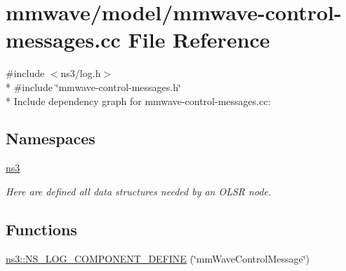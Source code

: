 \hypertarget{mmwave-control-messages_8cc}{}\section{mmwave/model/mmwave-\/control-\/messages.cc File Reference}
\label{mmwave-control-messages_8cc}
{\ttfamily \#include $<$ns3/log.\+h$>$}\\*
{\ttfamily \#include \char`\"{}mmwave-\/control-\/messages.\+h\char`\"{}}\\*
Include dependency graph for mmwave-\/control-\/messages.cc\+:
\subsection*{Namespaces}
\begin{DoxyCompactItemize}
\item 
 \hyperlink{namespacens3}{ns3}
\begin{DoxyCompactList}\small\item\em Here are defined all data structures needed by an O\+L\+SR node. \end{DoxyCompactList}\end{DoxyCompactItemize}
\subsection*{Functions}
\begin{DoxyCompactItemize}
\item 
\hyperlink{namespacens3_a3c3acc187f247fd3e4edb8e3a03a7e56}{ns3\+::\+N\+S\+\_\+\+L\+O\+G\+\_\+\+C\+O\+M\+P\+O\+N\+E\+N\+T\+\_\+\+D\+E\+F\+I\+NE} (\char`\"{}mm\+Wave\+Control\+Message\char`\"{})
\end{DoxyCompactItemize}
